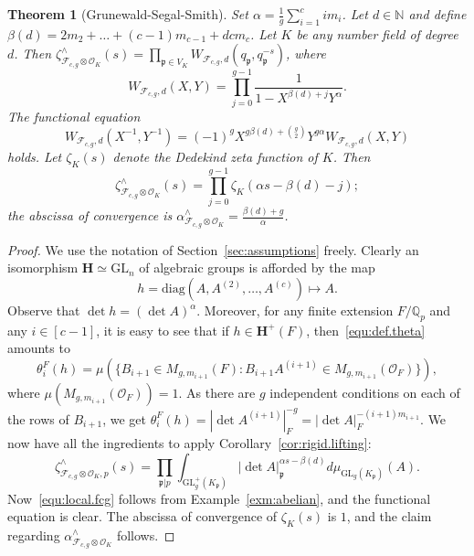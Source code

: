 \documentclass[11pt,a4paper]{amsart}
\theoremstyle{plain}
\newtheorem{thm}{Theorem}[section]
\theoremstyle{remark}
\newcommand{\N}{\mathbb{N}}
\newcommand{\Q}{\mathbb{Q}}
\newcommand{\tensor}{\otimes}
\newcommand{\p}{\mathfrak{p}}
\def \p {\ensuremath{\mathfrak{p}}}
\begin{document}
\begin{thm}[Grunewald-Segal-Smith] \label{pro:zeta.free}
Set $\alpha = \frac{1}{g} \sum_{i = 1}^c im_i$.  Let $d \in \N$ and define $\beta(d) = 2 m_2 + \dots + (c-1) m_{c-1} + dc m_c$.
Let $K$ be any number field of degree $d$.  
Then $\zeta^\wedge_{\mathcal{F}_{c,g} \tensor \mathcal{O}_K}(s) = \prod_{\p \in V_K} W_{\mathcal{F}_{c,g},d}(q_\p, q_\p^{-s})$, where
\begin{equation} \label{equ:local.fcg}
W_{\mathcal{F}_{c,g},d}(X,Y) = \prod_{j = 0}^{g-1} \frac{1}{1 - X^{\beta(d) + j} Y^\alpha}.
\end{equation}
The functional equation
\begin{equation} \label{equ:free.funct.eq}
W_{\mathcal{F}_{c,g},d}(X^{-1}, Y^{-1}) = (-1)^g X^{g \beta(d) + \binom{g}{2}}Y^{g \alpha} W_{\mathcal{F}_{c,g},d}(X,Y)
\end{equation}
holds.  Let $\zeta_K(s)$ denote the Dedekind zeta function of $K$.  Then
\begin{equation*}
\zeta^\wedge_{\mathcal{F}_{c,g} \tensor \mathcal{O}_K}(s) = \prod_{j = 0}^{g-1} \zeta_K(\alpha s - \beta(d) - j);
\end{equation*}
the abscissa of convergence is $\alpha^\wedge_{\mathcal{F}_{c,g} \tensor \mathcal{O}_K} = \frac{\beta(d) + g}{\alpha}$.  
\end{thm}
\begin{proof}
We use the notation of Section~\ref{sec:assumptions} freely.
Clearly an isomorphism $\mathbf{H} \simeq \mathrm{GL}_n$ of algebraic groups is afforded by the map 
$$h = \mathrm{diag}(A, A^{(2)}, \dots, A^{(c)}) \mapsto A.$$  
Observe that $\det h = (\det A)^\alpha$.  Moreover, for any finite extension $F / \Q_p$ and any $i \in [c-1]$, it is easy to see that if $h \in \mathbf{H}^+(F)$, then~\eqref{equ:def.theta} amounts to
\begin{equation*}
\theta_i^F (h) = \mu ( \{ B_{i+1} \in M_{g, m_{i+1}} (F) : B_{i+1} A^{(i+1)} \in M_{g, m_{i+1}}(\mathcal{O}_F) \} ),
\end{equation*}
where $\mu (M_{g, m_{i+1}}(\mathcal{O}_F)) = 1$.  As there are $g$ independent conditions on each of the rows of $B_{i+1}$, we get
$ \theta_i^F (h)  = | \det A^{(i+1)} |_F^{-g} = | \det A |_F^{-(i+1) m_{i+1}}$.
We now have all the ingredients to apply Corollary~\ref{cor:rigid.lifting}:
\begin{equation*}
\zeta^\wedge_{\mathcal{F}_{c,g} \tensor \mathcal{O}_K,p}(s) = \prod_{\p | p} \int_{\mathrm{GL}_g^+ (K_\p)} | \det A |_{\p}^{\alpha s - \beta(d)} d \mu_{\mathrm{GL}_g (K_\p)} (A).
\end{equation*}
Now~\eqref{equ:local.fcg} follows from Example~\ref{exm:abelian}, and the functional equation is clear.  The abscissa of convergence of $\zeta_K(s)$ is $1$, and the claim regarding $\alpha^\wedge_{\mathcal{F}_{c,g} \tensor \mathcal{O}_K}$ follows.
\end{proof}
\end{document}
